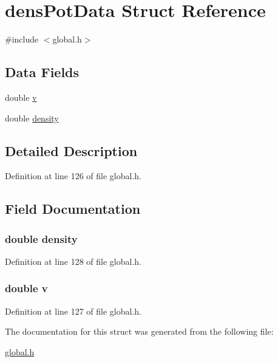 \hypertarget{structdensPotData}{\section{dens\-Pot\-Data Struct Reference}
\label{structdensPotData}
}


{\ttfamily \#include $<$global.\-h$>$}

\subsection*{Data Fields}
\begin{DoxyCompactItemize}
\item 
double \hyperlink{structdensPotData_a3b90d5a73541ab9402511d87bed076ef}{v}
\item 
double \hyperlink{structdensPotData_a6f8c052f8417728038991f7f2826d38d}{density}
\end{DoxyCompactItemize}


\subsection{Detailed Description}


Definition at line 126 of file global.\-h.



\subsection{Field Documentation}
\hypertarget{structdensPotData_a6f8c052f8417728038991f7f2826d38d}{
\subsubsection[{density}]{\setlength{\rightskip}{0pt plus 5cm}double density}}\label{structdensPotData_a6f8c052f8417728038991f7f2826d38d}


Definition at line 128 of file global.\-h.

\hypertarget{structdensPotData_a3b90d5a73541ab9402511d87bed076ef}{
\subsubsection[{v}]{\setlength{\rightskip}{0pt plus 5cm}double v}}\label{structdensPotData_a3b90d5a73541ab9402511d87bed076ef}


Definition at line 127 of file global.\-h.



The documentation for this struct was generated from the following file\-:\begin{DoxyCompactItemize}
\item 
\hyperlink{global_8h}{global.\-h}\end{DoxyCompactItemize}
